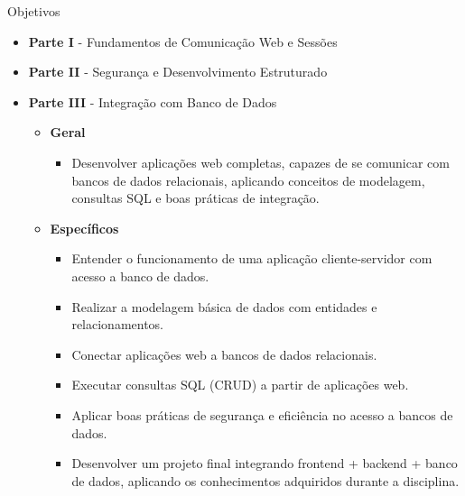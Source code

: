 \documentclass{beamer}
\begin{document}
\begin{frame}{Objetivos}
    \begin{itemize}
        \justifying
        \item \textbf{Parte I} - Fundamentos de Comunicação Web e Sessões
        \item \textbf{Parte II} - Segurança e Desenvolvimento Estruturado
        \item \textbf{Parte III} - Integração com Banco de Dados
            \begin{itemize}
                \item \textbf{Geral}
                    \begin{itemize}
                        \justifying
                        \scriptsize
                        \item Desenvolver aplicações web completas, capazes de se comunicar com bancos de dados relacionais, aplicando conceitos de modelagem, consultas SQL e boas práticas de integração.
                    \end{itemize}
                \item \textbf{Específicos}
                    \begin{itemize}
                        \justifying
                        \scriptsize
                        \item Entender o funcionamento de uma aplicação cliente-servidor com acesso a banco de dados.
                        \item Realizar a modelagem básica de dados com entidades e relacionamentos.
                        \item Conectar aplicações web a bancos de dados relacionais.
                        \item Executar consultas SQL (CRUD) a partir de aplicações web.
                        \item Aplicar boas práticas de segurança e eficiência no acesso a bancos de dados.
                        \item Desenvolver um projeto final integrando frontend + backend + banco de dados, aplicando os conhecimentos adquiridos durante a disciplina.
                    \end{itemize}
            \end{itemize}
    \end{itemize}
\end{frame}

\end{document}
